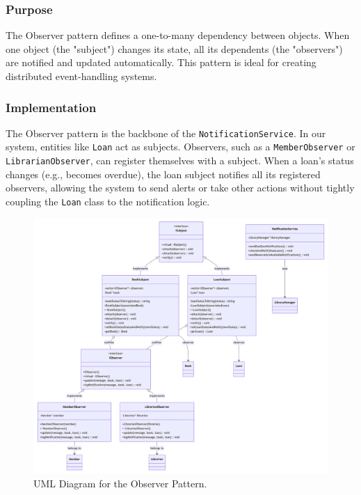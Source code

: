 \subsubsection{Purpose}
The Observer pattern defines a one-to-many dependency between objects. When one object (the "subject") changes its state, all its dependents (the "observers") are notified and updated automatically. This pattern is ideal for creating distributed event-handling systems.

\subsubsection{Implementation}
The Observer pattern is the backbone of the \texttt{NotificationService}. In our system, entities like \texttt{Loan} act as subjects. Observers, such as a \texttt{MemberObserver} or \texttt{LibrarianObserver}, can register themselves with a subject. When a loan's status changes (e.g., becomes overdue), the loan subject notifies all its registered observers, allowing the system to send alerts or take other actions without tightly coupling the \texttt{Loan} class to the notification logic.

\begin{figure}[H]
    \centering
    \includegraphics[width=\textwidth]{figures/observer_pattern.png}
    \caption{UML Diagram for the Observer Pattern.}
    \label{fig:observer_pattern}
\end{figure}

